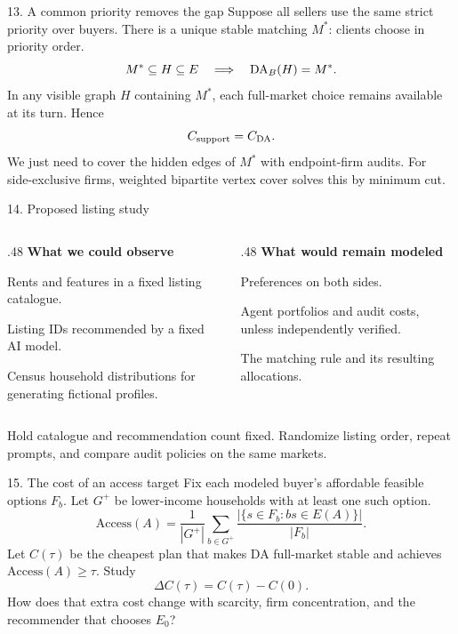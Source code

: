 \begin{frame}[t,label=priority]{13. A common priority removes the gap}
\small
Suppose all sellers use the same strict priority over buyers.
There is a unique stable matching $M^*$: clients choose in priority order.
\[
 M^*\subseteq H\subseteq E\quad\Longrightarrow\quad\operatorname{DA}_{B}(H)=M^*.
\]
In any visible graph $H$ containing $M^*$, each full-market choice remains
available at its turn. Hence
\[
 C_{\mathrm{support}}=C_{\mathrm{DA}}.
\]
We just need to cover the hidden edges of $M^*$ with endpoint-firm audits.
For side-exclusive firms, weighted bipartite vertex cover solves this by minimum cut.
\end{frame}

\begin{frame}[t,label=study]{14. Proposed listing study}
\small
\begin{columns}[T,onlytextwidth]
\begin{column}{.48\textwidth}
\textbf{What we could observe}\par
Rents and features in a fixed listing catalogue.\par
Listing IDs recommended by a fixed AI model.\par
Census household distributions for generating fictional profiles.
\end{column}
\begin{column}{.48\textwidth}
\textbf{What would remain modeled}\par
Preferences on both sides.\par
Agent portfolios and audit costs, unless independently verified.\par
The matching rule and its resulting allocations.
\end{column}
\end{columns}
\medskip
Hold catalogue and recommendation count fixed. Randomize listing order,
repeat prompts, and compare audit policies on the same markets.
\end{frame}

\begin{frame}[t,label=access]{15. The cost of an access target}
\small
Fix each modeled buyer's affordable feasible options $F_b$.
Let $G^+$ be lower-income households with at least one such option.
\[
 \mathrm{Access}(A)=\frac{1}{|G^+|}\sum_{b\in G^+}
 \frac{|\{s\in F_b:bs\in E(A)\}|}{|F_b|}.
\]
Let $C(\tau)$ be the cheapest plan that makes DA full-market stable
and achieves $\mathrm{Access}(A)\geq\tau$. Study
\[
 \Delta C(\tau)=C(\tau)-C(0).
\]
How does that extra cost change with scarcity, firm concentration,
and the recommender that chooses $E_0$?
\end{frame}

